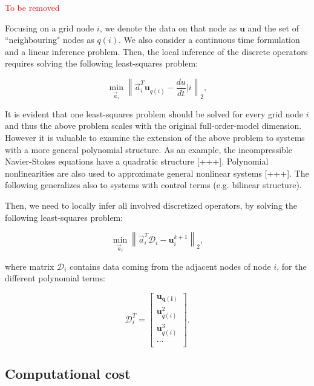 \documentclass[%
  twocolumn
]{mpi2015-cscpreprint}
\begin{document}
\textcolor{red}{To be removed}

Focusing on a grid node $i$, we denote the data on that node as $\mathbf{u}$ and the set of ``neighbouring" nodes as $q(i)$. We also consider a continuous time formulation and a linear inference problem. Then, the local inference of the discrete operators requires solving the following least-squares problem:

\begin{equation}
\min _{\Vec{a}_i}{\left\|\Vec{a}_i^T \mathbf{u}_{q(i)}-\frac{du}{dt}|i\right\|_{2}},
\end{equation}


It is evident that one least-squares problem should be solved for every grid node $i$ and thus the above problem scales with the original full-order-model dimension. However it is valuable to examine the extension of the above problem to systems with a more general polynomial structure. As an example, the incompressible Navier-Stokes equations have a quadratic structure [+++]. Polynomial nonlinearities are also used to approximate general nonlinear systems [+++]. The following generalizes also to systems with control terms (e.g. bilinear structure).



Then, we need to locally infer all involved discretized operators, by solving the following least-squares problem:

\begin{equation} 
\label{LS_noreg}
\min _{\Vec{a}_i}{\left\|\Vec{a}_i^T \mathcal{D}_i-\mathbf{u}_i^{k+1}\right\|_{2}},
\end{equation}

where matrix $\mathcal{D}_i$ contains data coming from the adjacent nodes of node $i$, for the different polynomial terms:

\begin{equation}
\label{Dmat}
\mathcal{D}_i^T=
\begin{bmatrix}
  \mathbf{u_{q(i)}} \\
  \mathbf{u}_{q(i)}^2\\
  \mathbf{u}_{q(i)}^3\\
  ...\\
\end{bmatrix}
.
\end{equation}


\subsection{Computational cost}
\end{document}
